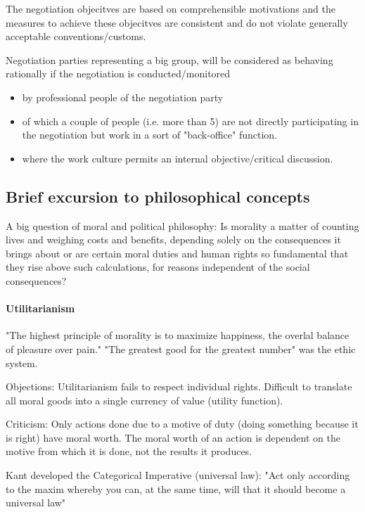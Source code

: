 \vspace{1\baselineskip}

\begin{definition}
    The negotiation objecitves are based on comprehensible motivations and
    the measures to achieve these objecitves are consistent and do not violate
    generally acceptable conventions/customs.
\end{definition}

\vspace{1\baselineskip}

Negotiation parties representing a big group, will be considered as behaving
rationally if the negotiation is conducted/monitored
\begin{itemize}
    \item by professional people of the negotiation party
    \item of which a couple of people (i.e. more than 5) are not directly
        participating in the negotiation but work in a sort of "back-office" function.
    \item where the work culture permits an internal objective/critical discussion.
\end{itemize}

\subsection{Brief excursion to philosophical concepts}

A big question of moral and political philosophy: Is morality a matter of
counting lives and weighing costs and benefits, depending solely on the consequences
it brings about or are certain moral duties and human rights so fundamental that they
rise above such calculations, for reasons independent of the social consequences?

\paragraph{Utilitarianism}

"The highest principle of morality is to maximize happiness, the overlal balance
of pleasure over pain."
"The greatest good for the greatest number" was the ethic system.

Objections: Utilitarianism fails to respect individual rights. Difficult to
translate all moral goods into a single currency of value (utility function).

Criticism: Only actions done due to a motive of duty (doing something because
it is right) have moral worth. The moral worth of an action is dependent on the
motive from which it is done, not the results it produces.

Kant developed the Categorical Imperative (universal law): "Act only according
to the maxim whereby you can, at the same time, will that it should become a
universal law"
